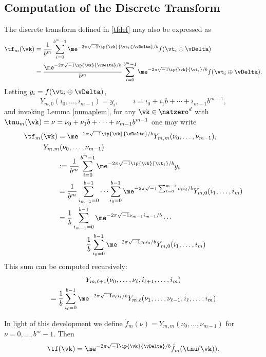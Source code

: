 \documentclass[]{elsarticle}
\theoremstyle{definition}
\renewcommand{\bbK}{\natzero^d}
\begin{document}
\subsection{Computation of the Discrete Transform}
The discrete transform defined in \eqref{tfdef} may also be expressed as
\begin{align}
\nonumber
\tf_m(\vk) 
&= \frac{1}{b^m} \sum_{i=0}^{b^m-1} \me^{-2 \pi \sqrt{-1} \ip{\vk}{\vt_i\oplus \vDelta}/b} f(\vt_i\oplus \vDelta) \\
\nonumber
&= \frac{\me^{-2 \pi \sqrt{-1} \ip{\vk}{\vDelta}/b}}{b^m} \sum_{i=0}^{b^m-1} \me^{-2 \pi \sqrt{-1} \ip{\vk}{\vt_i}/b} f(\vt_i\oplus \vDelta).
\end{align}
Letting $y_i=f(\vt_i\oplus \vDelta)$, 
\[
Y_{m,0}(i_0,\ldots, i_{m-1}) = y_i, \qquad i=i_0 + i_1 b + \cdots + i_{m-1} b^{m-1},
\]
and invoking Lemma \ref{numaplem}, for any $\vk \in \bbK$ with $\tnu_m(\vk)=\nu = \nu_0 + \nu_1 b  + \cdots + \nu_{m-1} b^{m-1}$ one may write
\begin{align}
\nonumber
\tf_m(\vk) &= \me^{-2 \pi \sqrt{-1} \ip{\vk}{\vDelta}/b}  Y_{m,m}(\nu_0, \ldots, \nu_{m-1}) , \\
\nonumber
\MoveEqLeft{Y_{m,m}(\nu_0, \ldots, \nu_{m-1})}\\ 
\nonumber
& : = \frac{1}{b^m} \sum_{i=0}^{b^m-1} \me^{-2 \pi \sqrt{-1} \ip{\vk}{\vt_i}/b} y_i \\
\nonumber
& = \frac{1}{b^m} \sum_{i_{m-1}=0}^{b-1} \cdots \sum_{i_0=0}^{b-1} \me^{-2 \pi \sqrt{-1} \sum_{\ell=0}^{m-1} \nu_\ell i_\ell/b} Y_{m,0}(i_1,\ldots, i_m) \\
\nonumber
& = \frac{1}{b} \sum_{i_{m-1}=0}^{b-1}\me^{-2 \pi \sqrt{-1} \nu_{m-1} i_{m-1}/b}  \cdots \\
&\qquad \qquad \frac{1}{b} \sum_{i_0=0}^{b-1} \me^{-2 \pi \sqrt{-1} \nu_0 i_0/b} Y_{m,0}(i_1,\ldots, i_m)
\nonumber
\end{align}
This sum can be computed recursively:
\begin{multline*}
Y_{m,\ell+1}(\nu_0, \ldots, \nu_{\ell},i_{\ell+1}, \ldots, i_m) \\
= \frac{1}{b} \sum_{i_\ell=0}^{b-1} \me^{-2 \pi \sqrt{-1} \nu_\ell i_\ell/b } Y_{m,\ell}(\nu_1, \ldots, \nu_{\ell-1},i_{\ell}, \ldots, i_m)
\end{multline*}

In light of this development we define $\mathring{f}_m(\nu)=Y_{m,m}(\nu_0, \ldots, \nu_{m-1})$ for $\nu=0, \ldots, b^{m}-1$. Then 
\[
\tf(\vk) = \me^{-2 \pi \sqrt{-1} \ip{\vk}{\vDelta}/b} \mathring{f}_m(\tnu(\vk)).
\]
\end{document}
